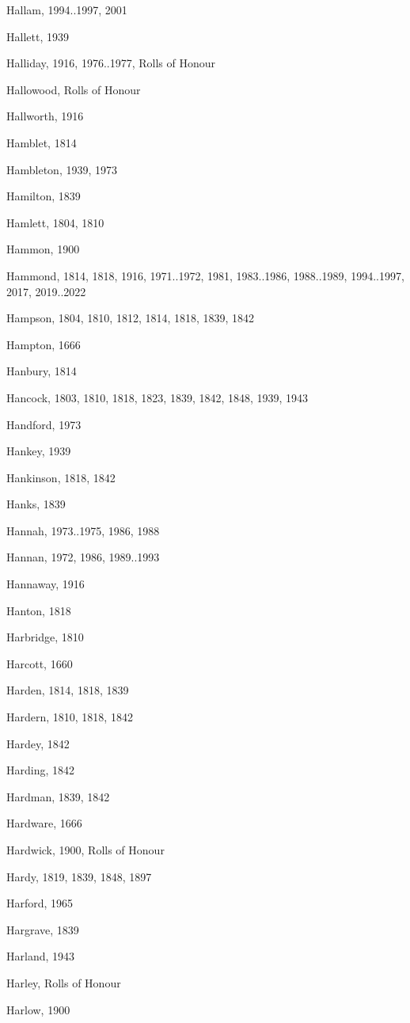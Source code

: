 \begin{theindex}
\item Hallam, 1994..1997, 2001
\item Hallett, 1939
\item Halliday, 1916, 1976..1977, Rolls of Honour
\item Hallowood, Rolls of Honour
\item Hallworth, 1916
\item Hamblet, 1814
\item Hambleton, 1939, 1973
\item Hamilton, 1839
\item Hamlett, 1804, 1810
\item Hammon, 1900
\item Hammond, 1814, 1818, 1916, 1971..1972, 1981, 1983..1986, 1988..1989, 1994..1997, 2017, 2019..2022
\item Hampson, 1804, 1810, 1812, 1814, 1818, 1839, 1842
\item Hampton, 1666
\item Hanbury, 1814
\item Hancock, 1803, 1810, 1818, 1823, 1839, 1842, 1848, 1939, 1943
\item Handford, 1973
\item Hankey, 1939
\item Hankinson, 1818, 1842
\item Hanks, 1839
\item Hannah, 1973..1975, 1986, 1988
\item Hannan, 1972, 1986, 1989..1993
\item Hannaway, 1916
\item Hanton, 1818
\item Harbridge, 1810
\item Harcott, 1660
\item Harden, 1814, 1818, 1839
\item Hardern, 1810, 1818, 1842
\item Hardey, 1842
\item Harding, 1842
\item Hardman, 1839, 1842
\item Hardware, 1666
\item Hardwick, 1900, Rolls of Honour
\item Hardy, 1819, 1839, 1848, 1897
\item Harford, 1965
\item Hargrave, 1839
\item Harland, 1943
\item Harley, Rolls of Honour
\item Harlow, 1900

\end{theindex}
